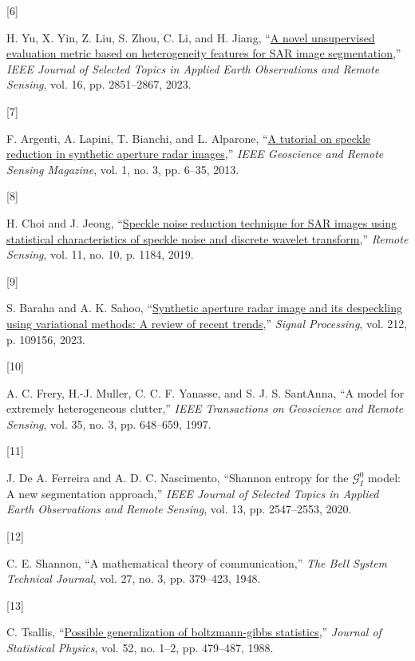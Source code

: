 \documentclass[
  lettersize  journal,
]{IEEEtran}%
\newlength{\cslhangindent}
\newlength{\csllabelwidth}
\newenvironment{CSLReferences}[2] %
 {\begin{list}{}{%
  \setlength{\itemindent}{0pt}
  \setlength{\leftmargin}{0pt}
  \setlength{\parsep}{0pt}
  \ifodd #1
   \setlength{\leftmargin}{\cslhangindent}
   \setlength{\itemindent}{-1\cslhangindent}
  \fi
  \setlength{\itemsep}{#2\baselineskip}}}
 {\end{list}}
\newcommand{\CSLLeftMargin}[1]{\parbox[t]{\csllabelwidth}{\strut#1\strut}}
\newcommand{\CSLRightInline}[1]{\parbox[t]{\linewidth - \csllabelwidth}{\strut#1\strut}}
\begin{document}
\begin{CSLReferences}{0}{0}
\CSLLeftMargin{{[}6{]} }%
\CSLRightInline{H. Yu, X. Yin, Z. Liu, S. Zhou, C. Li, and H. Jiang,
{``\href{https://doi.org/10.1109/jstars.2023.3257548}{A novel
unsupervised evaluation metric based on heterogeneity features for SAR
image segmentation},''} \emph{IEEE Journal of Selected Topics in Applied
Earth Observations and Remote Sensing}, vol. 16, pp. 2851--2867, 2023. }

\CSLLeftMargin{{[}7{]} }%
\CSLRightInline{F. Argenti, A. Lapini, T. Bianchi, and L. Alparone,
{``\href{https://doi.org/10.1109/mgrs.2013.2277512}{A tutorial on
speckle reduction in synthetic aperture radar images},''} \emph{IEEE
Geoscience and Remote Sensing Magazine}, vol. 1, no. 3, pp. 6--35, 2013.
}

\CSLLeftMargin{{[}8{]} }%
\CSLRightInline{H. Choi and J. Jeong,
{``\href{https://doi.org/10.3390/rs11101184}{Speckle noise reduction
technique for SAR images using statistical characteristics of speckle
noise and discrete wavelet transform},''} \emph{Remote Sensing}, vol.
11, no. 10, p. 1184, 2019. }

\CSLLeftMargin{{[}9{]} }%
\CSLRightInline{S. Baraha and A. K. Sahoo,
{``\href{https://doi.org/10.1016/j.sigpro.2023.109156}{Synthetic
aperture radar image and its despeckling using variational methods: A
review of recent trends},''} \emph{Signal Processing}, vol. 212, p.
109156, 2023. }

\CSLLeftMargin{{[}10{]} }%
\CSLRightInline{A. C. Frery, H.-J. Muller, C. C. F. Yanasse, and S. J.
S. SantAnna, {``A model for extremely heterogeneous clutter,''}
\emph{{IEEE} Transactions on Geoscience and Remote Sensing}, vol. 35,
no. 3, pp. 648--659, 1997. }

\CSLLeftMargin{{[}11{]} }%
\CSLRightInline{J. De A. Ferreira and A. D. C. Nascimento, {``Shannon
entropy for the {\(\mathcal {G}^0_{I}\)} model: A new segmentation
approach,''} \emph{{IEEE} Journal of Selected Topics in Applied Earth
Observations and Remote Sensing}, vol. 13, pp. 2547--2553, 2020. }

\CSLLeftMargin{{[}12{]} }%
\CSLRightInline{C. E. Shannon, {``A mathematical theory of
communication,''} \emph{The Bell System Technical Journal}, vol. 27, no.
3, pp. 379--423, 1948. }

\CSLLeftMargin{{[}13{]} }%
\CSLRightInline{C. Tsallis,
{``\href{https://doi.org/10.1007/bf01016429}{Possible generalization of
boltzmann-gibbs statistics},''} \emph{Journal of Statistical Physics},
vol. 52, no. 1--2, pp. 479--487, 1988. }


\end{CSLReferences}
\end{document}
